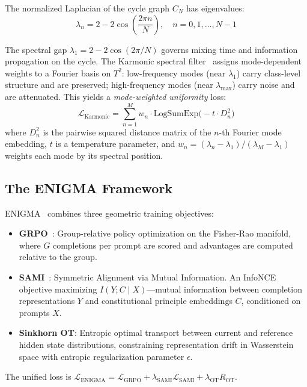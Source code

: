 \documentclass[11pt,a4paper]{article}
\begin{document}
The normalized Laplacian of the cycle graph $C_N$ has eigenvalues:
\begin{equation}
\lambda_n = 2 - 2\cos\!\left(\frac{2\pi n}{N}\right), \quad n = 0, 1, \ldots, N-1
\end{equation}

The spectral gap $\lambda_1 = 2 - 2\cos(2\pi/N)$ governs mixing time and information propagation on the cycle. The Karmonic spectral filter~\cite{cormier2026karmonic} assigns mode-dependent weights to a Fourier basis on $T^2$: low-frequency modes (near $\lambda_1$) carry class-level structure and are preserved; high-frequency modes (near $\lambda_{\max}$) carry noise and are attenuated. This yields a \emph{mode-weighted uniformity} loss:
\begin{equation}
\mathcal{L}_{\text{Karmonic}} = \sum_{n=1}^{M} w_n \cdot \text{LogSumExp}\bigl(-t \cdot D_n^2\bigr)
\end{equation}
where $D_n^2$ is the pairwise squared distance matrix of the $n$-th Fourier mode embedding, $t$ is a temperature parameter, and $w_n = (\lambda_n - \lambda_1)/(\lambda_M - \lambda_1)$ weights each mode by its spectral position.

\subsection{The ENIGMA Framework}

ENIGMA~\cite{seneque2025enigma} combines three geometric training objectives:

\begin{itemize}
    \item \textbf{GRPO}~\cite{shao2024deepseekmath}: Group-relative policy optimization on the Fisher-Rao manifold, where $G$ completions per prompt are scored and advantages are computed relative to the group.
    \item \textbf{SAMI}~\cite{franken2024sami}: Symmetric Alignment via Mutual Information. An InfoNCE objective maximizing $I(Y; C \mid X)$---mutual information between completion representations $Y$ and constitutional principle embeddings $C$, conditioned on prompts $X$.
    \item \textbf{Sinkhorn OT}: Entropic optimal transport between current and reference hidden state distributions, constraining representation drift in Wasserstein space with entropic regularization parameter $\epsilon$.
\end{itemize}

The unified loss is $\mathcal{L}_{\text{ENIGMA}} = \mathcal{L}_{\text{GRPO}} + \lambda_{\text{SAMI}} \mathcal{L}_{\text{SAMI}} + \lambda_{\text{OT}} R_{\text{OT}}$.
\end{document}
